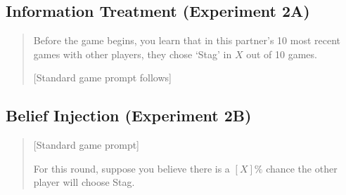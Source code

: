 \documentclass[12pt]{article}
\begin{document}
\subsection{Information Treatment (Experiment 2A)}

\begin{quote}
\small
Before the game begins, you learn that in this partner's 10 most recent games with other players, they chose `Stag' in $X$ out of 10 games.

[Standard game prompt follows]
\end{quote}

\subsection{Belief Injection (Experiment 2B)}

\begin{quote}
\small
[Standard game prompt]

For this round, suppose you believe there is a $[X]\%$ chance the other player will choose Stag.
\end{quote}




\end{document}
